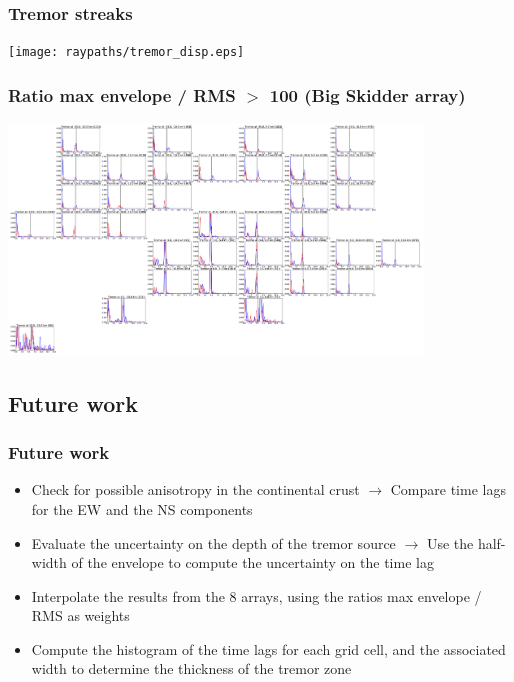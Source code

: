 \documentclass{beamer}
\begin{document}
	\begin{frame}
		\frametitle{Tremor streaks}
		\begin{center}
			\texttt{[image: raypaths/tremor\_disp.eps]}
		\end{center}
	\end{frame}

	\begin{frame}
		\frametitle{Ratio max envelope / RMS $>$ 100 (Big Skidder array)}
		\begin{center}
			\includegraphics[width=11cm, trim={26cm 44cm 53cm 15cm}, clip]{BS/BS_PWS_PWS.eps}
		\end{center}
	\end{frame}


	\subsection{Future work}


	\begin{frame}
		\frametitle{Future work}
		\begin{itemize}
			\item Check for possible anisotropy in the continental crust $\rightarrow$ Compare time lags for the EW and the NS components
			\item Evaluate the uncertainty on the depth of the tremor source $\rightarrow$ Use the half-width of the envelope to compute the uncertainty on the time lag
			\item Interpolate the results from the 8 arrays, using the ratios max envelope / RMS as weights
			\item Compute the histogram of the time lags for each grid cell, and the associated width to determine the thickness of the tremor zone
		\end{itemize}
	\end{frame}
\end{document}
